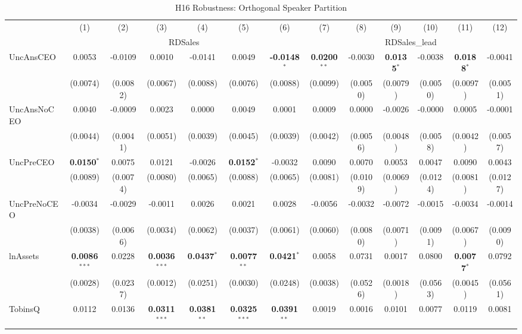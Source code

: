 \documentclass[11pt,a4paper]{article}
\begin{document}
\begin{table}[htbp]
\centering
\caption{H16 Robustness: Orthogonal Speaker Partition}
\label{tab:h16_robust}
\scriptsize
\begin{tabular}{lcccccccccccc}
\toprule
 & (1) & (2) & (3) & (4) & (5) & (6) & (7) & (8) & (9) & (10) & (11) & (12) \\
 & \multicolumn{6}{c}{RDSales} & \multicolumn{6}{c}{RDSales\_lead} \\
\cmidrule(lr){2-7} \cmidrule(lr){8-13}
\midrule
UncAnsCEO & 0.0053 & -0.0109 & 0.0010 & -0.0141 & 0.0049 & \textbf{-0.0148}$^{*}$ & \textbf{0.0200}$^{**}$ & -0.0030 & \textbf{0.0135}$^{*}$ & -0.0038 & \textbf{0.0188}$^{*}$ & -0.0041 \\
 & (0.0074) & (0.0082) & (0.0067) & (0.0088) & (0.0076) & (0.0088) & (0.0099) & (0.0050) & (0.0079) & (0.0050) & (0.0097) & (0.0051) \\
UncAnsNoCEO & 0.0040 & -0.0009 & 0.0023 & 0.0000 & 0.0049 & 0.0001 & 0.0009 & 0.0000 & -0.0026 & -0.0000 & 0.0005 & -0.0001 \\
 & (0.0044) & (0.0041) & (0.0051) & (0.0039) & (0.0045) & (0.0039) & (0.0042) & (0.0056) & (0.0048) & (0.0058) & (0.0042) & (0.0057) \\
UncPreCEO & \textbf{0.0150}$^{*}$ & 0.0075 & 0.0121 & -0.0026 & \textbf{0.0152}$^{*}$ & -0.0032 & 0.0090 & 0.0070 & 0.0053 & 0.0047 & 0.0090 & 0.0043 \\
 & (0.0089) & (0.0074) & (0.0080) & (0.0065) & (0.0088) & (0.0065) & (0.0081) & (0.0109) & (0.0069) & (0.0124) & (0.0081) & (0.0127) \\
UncPreNoCEO & -0.0034 & -0.0029 & -0.0011 & 0.0026 & 0.0021 & 0.0028 & -0.0056 & -0.0032 & -0.0072 & -0.0015 & -0.0034 & -0.0014 \\
 & (0.0038) & (0.0066) & (0.0034) & (0.0062) & (0.0037) & (0.0061) & (0.0060) & (0.0080) & (0.0071) & (0.0091) & (0.0067) & (0.0090) \\
\midrule
lnAssets & \textbf{0.0086}$^{***}$ & 0.0228 & \textbf{0.0036}$^{***}$ & \textbf{0.0437}$^{*}$ & \textbf{0.0077}$^{**}$ & \textbf{0.0421}$^{*}$ & 0.0058 & 0.0731 & 0.0017 & 0.0800 & \textbf{0.0077}$^{*}$ & 0.0792 \\
 & (0.0028) & (0.0237) & (0.0012) & (0.0251) & (0.0030) & (0.0248) & (0.0038) & (0.0526) & (0.0018) & (0.0563) & (0.0045) & (0.0561) \\
TobinsQ & 0.0112 & 0.0136 & \textbf{0.0311}$^{***}$ & \textbf{0.0381}$^{**}$ & \textbf{0.0325}$^{***}$ & \textbf{0.0391}$^{**}$ & 0.0019 & 0.0016 & 0.0101 & 0.0077 & 0.0119 & 0.0081 \\

\end{tabular}
\end{table}
\end{document}
